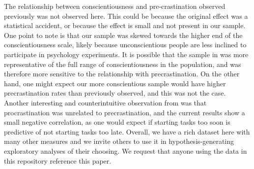 \documentclass[]{rsos}
\begin{document}
The relationship between conscientiousness and pre-crastination observed previously \cite{sauerberger2019} was not observed here. This could be because the original effect was a statistical accident, or because the effect is small and not present in our sample. One point to note is that our sample was skewed towards the higher end of the conscientiousness scale, likely because unconscientious people are less inclined to participate in psychology experiments. It is possible that the sample in \cite{sauerberger2019} was more representative of the full range of conscientiousness in the population, and was therefore more sensitive to the relationship with precrastination. On the other hand, one might expect our more conscientious sample would have higher precrastination rates than previously observed, and this was not the case. Another interesting and counterintuitive observation from \cite{sauerberger2019} was that procrastination was unrelated to precrastination, and the current results show a small negative correlation, as one would expect if starting tasks too soon is predictive of not starting tasks too late. Overall, we have a rich dataset here with many other measures and we invite others to use it in hypothesis-generating exploratory analyses of their choosing. We request that anyone using the data in this repository reference this paper.



\small

\end{document}
